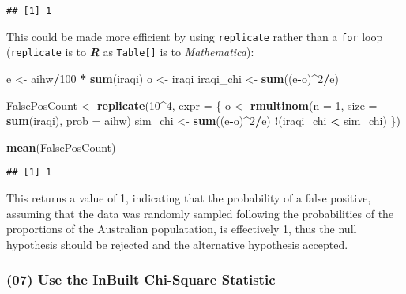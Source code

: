 \documentclass[
]{article}
\newenvironment{Shaded}{\begin{snugshade}}{\end{snugshade}}
\newcommand{\DataTypeTok}[1]{\textcolor[rgb]{0.13,0.29,0.53}{#1}}
\newcommand{\DecValTok}[1]{\textcolor[rgb]{0.00,0.00,0.81}{#1}}
\newcommand{\KeywordTok}[1]{\textcolor[rgb]{0.13,0.29,0.53}{\textbf{#1}}}
\newcommand{\NormalTok}[1]{#1}
\newcommand{\OperatorTok}[1]{\textcolor[rgb]{0.81,0.36,0.00}{\textbf{#1}}}
\newcommand{\StringTok}[1]{\textcolor[rgb]{0.31,0.60,0.02}{#1}}
\begin{document}
\begin{verbatim}
## [1] 1
\end{verbatim}

This could be made more efficient by using \texttt{replicate} rather
than a \texttt{for} loop (\texttt{replicate} is to \textbf{\emph{R}} as
\texttt{Table{[}{]}} is to \emph{Mathematica}):

\begin{Shaded}
\begin{Highlighting}[]
\NormalTok{e <{-}}\StringTok{ }\NormalTok{aihw}\OperatorTok{/}\DecValTok{100} \OperatorTok{*}\StringTok{ }\KeywordTok{sum}\NormalTok{(iraqi)}
\NormalTok{o <{-}}\StringTok{ }\NormalTok{iraqi}
\NormalTok{iraqi\_chi <{-}}\StringTok{ }\KeywordTok{sum}\NormalTok{((e}\OperatorTok{{-}}\NormalTok{o)}\OperatorTok{\^{}}\DecValTok{2}\OperatorTok{/}\NormalTok{e)}

\NormalTok{FalsePosCount <{-}}\StringTok{ }\KeywordTok{replicate}\NormalTok{(}\DecValTok{10}\OperatorTok{\^{}}\DecValTok{4}\NormalTok{, }\DataTypeTok{expr =}\NormalTok{ \{}
\NormalTok{  o <{-}}\StringTok{ }\KeywordTok{rmultinom}\NormalTok{(}\DataTypeTok{n =} \DecValTok{1}\NormalTok{, }\DataTypeTok{size =} \KeywordTok{sum}\NormalTok{(iraqi), }\DataTypeTok{prob =}\NormalTok{ aihw)}
\NormalTok{  sim\_chi <{-}}\StringTok{ }\KeywordTok{sum}\NormalTok{((e}\OperatorTok{{-}}\NormalTok{o)}\OperatorTok{\^{}}\DecValTok{2}\OperatorTok{/}\NormalTok{e)}
  \OperatorTok{!}\NormalTok{(iraqi\_chi }\OperatorTok{<}\StringTok{ }\NormalTok{sim\_chi)}
\NormalTok{\})}

\KeywordTok{mean}\NormalTok{(FalsePosCount)}
\end{Highlighting}
\end{Shaded}

\begin{verbatim}
## [1] 1
\end{verbatim}

This returns a value of 1, indicating that the probability of a false
positive, assuming that the data was randomly sampled following the
probabilities of the proportions of the Australian populatation, is
effectively 1, thus the null hypothesis should be rejected and the
alternative hypothesis accepted.

\hypertarget{use-the-inbuilt-chi-square-statistic}{%
\subsubsection{(07) Use the InBuilt Chi-Square
Statistic}\label{use-the-inbuilt-chi-square-statistic}}
\end{document}
